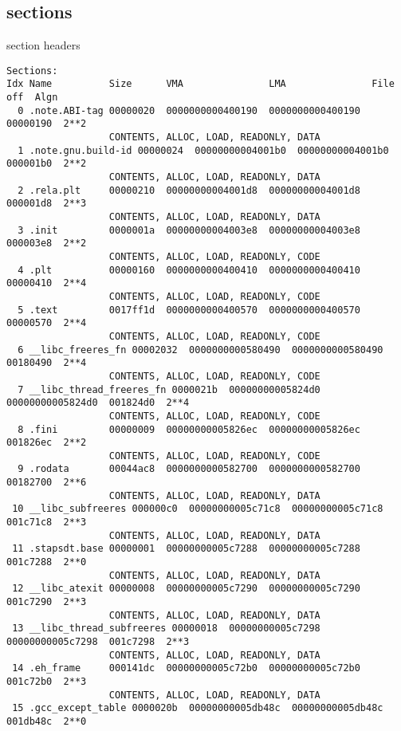 \subsection{sections}

\begin{frame}[fragile,label=sectHeader]{section headers}
\vspace{-.25cm}
\begin{Verbatim}[fontsize=\tiny]
Sections:
Idx Name          Size      VMA               LMA               File off  Algn
  0 .note.ABI-tag 00000020  0000000000400190  0000000000400190  00000190  2**2
                  CONTENTS, ALLOC, LOAD, READONLY, DATA
  1 .note.gnu.build-id 00000024  00000000004001b0  00000000004001b0  000001b0  2**2
                  CONTENTS, ALLOC, LOAD, READONLY, DATA
  2 .rela.plt     00000210  00000000004001d8  00000000004001d8  000001d8  2**3
                  CONTENTS, ALLOC, LOAD, READONLY, DATA
  3 .init         0000001a  00000000004003e8  00000000004003e8  000003e8  2**2
                  CONTENTS, ALLOC, LOAD, READONLY, CODE
  4 .plt          00000160  0000000000400410  0000000000400410  00000410  2**4
                  CONTENTS, ALLOC, LOAD, READONLY, CODE
  5 .text         0017ff1d  0000000000400570  0000000000400570  00000570  2**4
                  CONTENTS, ALLOC, LOAD, READONLY, CODE
  6 __libc_freeres_fn 00002032  0000000000580490  0000000000580490  00180490  2**4
                  CONTENTS, ALLOC, LOAD, READONLY, CODE
  7 __libc_thread_freeres_fn 0000021b  00000000005824d0  00000000005824d0  001824d0  2**4
                  CONTENTS, ALLOC, LOAD, READONLY, CODE
  8 .fini         00000009  00000000005826ec  00000000005826ec  001826ec  2**2
                  CONTENTS, ALLOC, LOAD, READONLY, CODE
  9 .rodata       00044ac8  0000000000582700  0000000000582700  00182700  2**6
                  CONTENTS, ALLOC, LOAD, READONLY, DATA
 10 __libc_subfreeres 000000c0  00000000005c71c8  00000000005c71c8  001c71c8  2**3
                  CONTENTS, ALLOC, LOAD, READONLY, DATA
 11 .stapsdt.base 00000001  00000000005c7288  00000000005c7288  001c7288  2**0
                  CONTENTS, ALLOC, LOAD, READONLY, DATA
 12 __libc_atexit 00000008  00000000005c7290  00000000005c7290  001c7290  2**3
                  CONTENTS, ALLOC, LOAD, READONLY, DATA
 13 __libc_thread_subfreeres 00000018  00000000005c7298  00000000005c7298  001c7298  2**3
                  CONTENTS, ALLOC, LOAD, READONLY, DATA
 14 .eh_frame     000141dc  00000000005c72b0  00000000005c72b0  001c72b0  2**3
                  CONTENTS, ALLOC, LOAD, READONLY, DATA
 15 .gcc_except_table 0000020b  00000000005db48c  00000000005db48c  001db48c  2**0

\end{Verbatim}
\end{frame}
